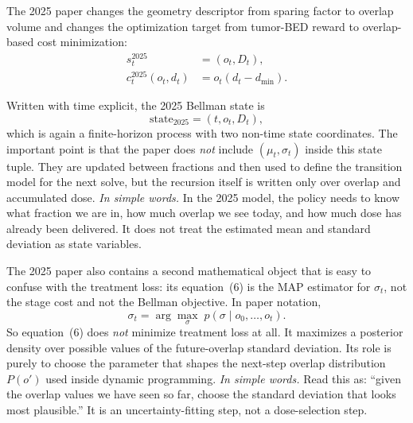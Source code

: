 \documentclass[11pt]{article}
\begin{document}
The 2025 paper changes the geometry descriptor from sparing factor to overlap volume and changes the optimization target from tumor-BED reward to overlap-based cost minimization:
\begin{align}
s_t^{2025} &= (o_t, D_t), \\
c_t^{2025}(o_t,d_t) &= o_t(d_t-d_{\min}).
\end{align}

Written with time explicit, the 2025 Bellman state is
\begin{equation}
\text{state}_{2025} = (t,o_t,D_t),
\end{equation}
which is again a finite-horizon process with two non-time state coordinates. The important point is that the paper does \emph{not} include $(\mu_t,\sigma_t)$ inside this state tuple. They are updated between fractions and then used to define the transition model for the next solve, but the recursion itself is written only over overlap and accumulated dose.
\noindent\textit{In simple words.} In the 2025 model, the policy needs to know what fraction we are in, how much overlap we see today, and how much dose has already been delivered. It does not treat the estimated mean and standard deviation as state variables.

The 2025 paper also contains a second mathematical object that is easy to confuse with the treatment loss: its equation~(6) is the MAP estimator for $\sigma_t$, not the stage cost and not the Bellman objective. In paper notation,
\begin{equation}
\sigma_t = \arg\max_{\sigma} \; p(\sigma \mid o_0,\ldots,o_t).
\end{equation}
So equation~(6) does \emph{not} minimize treatment loss at all. It maximizes a posterior density over possible values of the future-overlap standard deviation. Its role is purely to choose the parameter that shapes the next-step overlap distribution $P(o')$ used inside dynamic programming.
\noindent\textit{In simple words.} Read this as: ``given the overlap values we have seen so far, choose the standard deviation that looks most plausible.'' It is an uncertainty-fitting step, not a dose-selection step.
\end{document}
